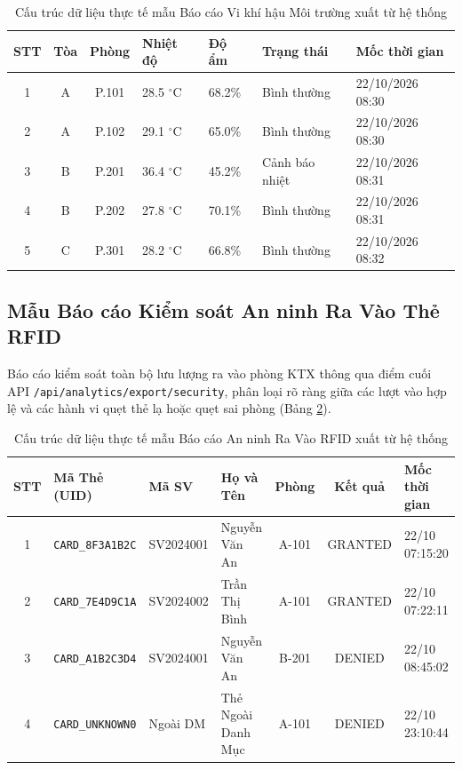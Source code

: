 \begin{table}[H]
\centering
\footnotesize
\begin{tabularx}{\textwidth}{|c|c|c|p{1.8cm}|p{1.5cm}|X|p{2.8cm}|}
\hline
\textbf{STT} & \textbf{Tòa} & \textbf{Phòng} & \textbf{Nhiệt độ} & \textbf{Độ ẩm} & \textbf{Trạng thái} & \textbf{Mốc thời gian} \\
\hline
1 & A & P.101 & 28.5 $^\circ\text{C}$ & 68.2\% & Bình thường & 22/10/2026 08:30 \\
\hline
2 & A & P.102 & 29.1 $^\circ\text{C}$ & 65.0\% & Bình thường & 22/10/2026 08:30 \\
\hline
3 & B & P.201 & 36.4 $^\circ\text{C}$ & 45.2\% & Cảnh báo nhiệt & 22/10/2026 08:31 \\
\hline
4 & B & P.202 & 27.8 $^\circ\text{C}$ & 70.1\% & Bình thường & 22/10/2026 08:31 \\
\hline
5 & C & P.301 & 28.2 $^\circ\text{C}$ & 66.8\% & Bình thường & 22/10/2026 08:32 \\
\hline
\end{tabularx}
\caption{Cấu trúc dữ liệu thực tế mẫu Báo cáo Vi khí hậu Môi trường xuất từ hệ thống}
\label{tab:mau_bao_cao_moitruong}
\end{table}

\subsection{Mẫu Báo cáo Kiểm soát An ninh Ra Vào Thẻ RFID}
Báo cáo kiểm soát toàn bộ lưu lượng ra vào phòng KTX thông qua điểm cuối API \texttt{/api/analytics/}\linebreak\texttt{export/security}, phân loại rõ ràng giữa các lượt vào hợp lệ và các hành vi quẹt thẻ lạ hoặc quẹt sai phòng (Bảng \ref{tab:mau_bao_cao_anninh}).

\begin{table}[H]
\centering
\footnotesize
\begin{tabularx}{\textwidth}{|c|p{2.6cm}|p{1.8cm}|X|c|c|p{2.4cm}|}
\hline
\textbf{STT} & \textbf{Mã Thẻ (UID)} & \textbf{Mã SV} & \textbf{Họ và Tên} & \textbf{Phòng} & \textbf{Kết quả} & \textbf{Mốc thời gian} \\
\hline
1 & \texttt{\scriptsize CARD\_8F3A1B2C} & SV2024001 & Nguyễn Văn An & A-101 & GRANTED & 22/10 07:15:20 \\
\hline
2 & \texttt{\scriptsize CARD\_7E4D9C1A} & SV2024002 & Trần Thị Bình & A-101 & GRANTED & 22/10 07:22:11 \\
\hline
3 & \texttt{\scriptsize CARD\_A1B2C3D4} & SV2024001 & Nguyễn Văn An & B-201 & DENIED & 22/10 08:45:02 \\
\hline
4 & \texttt{\scriptsize CARD\_UNKNOWN0} & Ngoài DM & Thẻ Ngoài Danh Mục & A-101 & DENIED & 22/10 23:10:44 \\
\hline
\end{tabularx}
\caption{Cấu trúc dữ liệu thực tế mẫu Báo cáo An ninh Ra Vào RFID xuất từ hệ thống}
\label{tab:mau_bao_cao_anninh}
\end{table}

